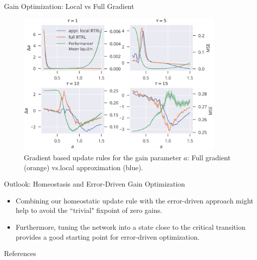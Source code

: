 \documentclass{beamer}
\begin{document}
\begin{frame}[t]
\begin{columns}[t]
\begin{column}{.55\textwidth}
\begin{myblock}{Gain Optimization: Local vs Full Gradient}
	\begin{figure}
		\includegraphics[width=0.9\textwidth]{../figures/delta_a_local_fix.png}
		\caption{Gradient based update rules for the gain parameter $a$: Full gradient (orange) vs.local approximation (blue).}
		\label{fig:delta_a_sim}
	\end{figure}
\end{myblock}

\begin{myblock}{Outlook: Homeostasis and Error-Driven Gain Optimization}
	\begin{itemize}
	\item Combining our homeostatic update rule with the error-driven approach might help to avoid the ``trivial" fixpoint of zero gains.
	\item Furthermore, tuning the network into a state close to the critical transition provides a good starting point for error-driven optimization. 
	\end{itemize}
\end{myblock}


\begin{myblock}{References}
	\scriptsize
	
\end{myblock}

\end{column}
\end{columns}
\end{frame}
\end{document}
